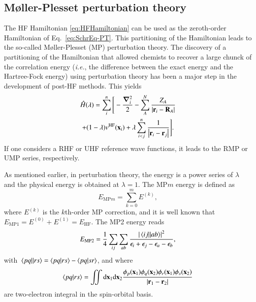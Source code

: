 \documentclass[aps,prb,reprint,noshowkeys,superscriptaddress]{revtex4-1}
\newcommand{\ie}{\textit{i.e.}}
\newcommand{\hH}{\Hat{H}}
\begin{document}
\subsection{M{\o}ller-Plesset perturbation theory}

The HF Hamiltonian \eqref{eq:HFHamiltonian} can be used as the zeroth-order Hamiltonian of Eq.~\eqref{eq:SchrEq-PT}. This partitioning of the Hamiltonian leads to the so-called M{\o}ller-Plesset (MP) perturbation theory. \cite{Moller_1934} 
The discovery of a partitioning of the Hamiltonian that allowed chemists to recover a large chunck of the correlation energy (\ie, the difference between the exact energy and the Hartree-Fock energy) using perturbation theory has been a major step in the development of post-HF methods. 
This yields
\begin{multline}\label{eq:MPHamiltonian}
    \hH(\lambda) = 
    \sum_{i}^{n} \Bigg[ 
    -\frac{\grad_i^2}{2} 
    - \sum_{A}^{N} \frac{Z_A}{\abs{\vb{r}_i-\vb{R}_A}} 
    \\
    + (1-\lambda) v^{\text{HF}}(\vb{x}_i) 
    + \lambda\sum_{i<j}^{n}\frac{1}{\abs{\vb{r}_i-\vb{r}_j}} 
    \Bigg].
\end{multline}
If one considers a RHF or UHF reference wave functions, it leads to the RMP or UMP series, respectively.

As mentioned earlier, in perturbation theory, the energy is a power series of $\lambda$ and the physical energy is obtained at $\lambda = 1$. 
The MP$m$ energy is defined as 
\begin{equation}
	E_{\text{MP}m}= \sum_{k=0}^m E^{(k)},
\end{equation}
where $E^{(k)}$ is the $k$th-order MP correction, and it is well known that $E_{\text{MP1}} =  E^{(0)} + E^{(1)} = E_\text{HF}$. \cite{SzaboBook}
The MP2 energy reads
\begin{equation}\label{eq:EMP2}
	E_{\text{MP2}} = \frac{1}{4} \sum_{ij} \sum_{ab} \frac{\abs{\mel{ij}{}{ab}}^2}{\epsilon_i + \epsilon_j - \epsilon_a - \epsilon_b},
\end{equation}
with $\mel{pq}{}{rs} = \braket{pq}{rs} - \braket{pq}{sr}$, and where  
\begin{equation}
	\braket{pq}{rs} = \iint \dd\vb{x}_1\dd\vb{x}_2\frac{\phi_p(\vb{x}_1)\phi_q(\vb{x}_2)\phi_r(\vb{x}_1)\phi_s(\vb{x}_2)}{\abs{\vb{r}_1 - \vb{r}_2}}
\end{equation}
are two-electron integral in the spin-orbital basis. \cite{Gill_1994}
\end{document}
